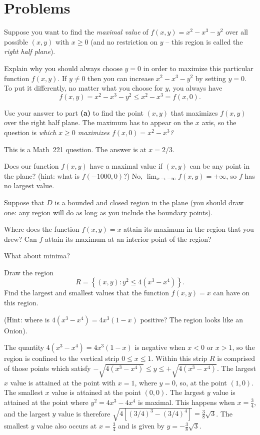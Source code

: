 \section{Problems}    
\begin{multicols}{2}
\problemfont 

\problem Suppose you want to find the \emph{maximal value} of $f(x, y) =  
x^2-x^3-y^2$ over all possible $(x,y)$ with $x\geq 0$ (and no restriction
on $y$ -- this region is called the \textit{right half plane}).

\subprob Explain why you should always choose $y=0$ in order to 
maximize this particular function $f(x, y)$.
\answer If $y\neq0$ then you can increase $x^2-x^3-y^2$ by setting $y=0$.  
To put it differently, no matter what you choose for $y$, you always have
\[
  f(x, y) = x^2-x^3-y^2 \leq x^2-x^3  =  f(x, 0).
\]
\endanswer

\subprob Use your answer to part \textbf{(a)} to find the point $(x, y)$ that 
maximizes $f(x,y)$ over the right half plane.
\answer 
The maximum has to appear on the $x$ axis, so the question is
\textit{which $x\geq0$ maximizes $f(x, 0) = x^2-x^3$?}

This is a Math~221 question.  The answer is at $x=2/3$.
\endanswer

\subprob Does our function $f(x,y)$ have a maximal value if $(x,y)$ can be 
any point in the plane?  (hint: what is $f(-1000, 0)$?)
\answer  
No, $\lim_{x\to-\infty} f(x, y) = +\infty$, so $f$ has no largest value.
\endanswer

\problem Suppose that $D$ is a bounded and closed region in the plane (you should draw one: any region will do as long as you include the boundary points).

Where does the function $f(x, y)=x$ attain its maximum in the region that you drew?  Can $f$ attain its maximum at an interior point of the region?

What about minima?

\problem Draw the region
\[
R=\left\{ (x,y) : y^2\leq 4(x^3-x^4)  \right\}.
\]
Find the largest and smallest values that the function
$f(x, y) = x$ can have on this region.  

(Hint: where is $4(x^3-x^4) = 4x^3(1-x)$ positive? The region looks like an Onion).
\answer  
%

The quantity $4(x^3-x^4) = 4x^3(1-x)$ is negative when $x<0$ or
$x>1$, so the region is confined to the vertical strip $0\leq x \leq
1$.  Within this strip $R$ is comprised of those points which satisfy
$-\sqrt{4(x^3-x^4)} \leq y \leq +\sqrt{4(x^3-x^4)}$.  The largest
$x$ value is attained at the point with $x=1$, where $y=0$, so, at the
point $(1,0)$.  The smallest $x$ value is attained at the point
$(0,0)$.   The largest $y$ value is attained at the point where
$y^2 = 4x^3-4x^4$ is maximal.  This happens when $x=\frac 34$, and the
largest $y$ value is therefore $\sqrt{4[(3/4)^3-(3/4)^4]} = \frac
38\sqrt{3}$.  The smallest $y$ value also occurs at $x=\frac 34$ and
is given by $y = -\frac 38 \sqrt 3$.
\endanswer

\noproblemfont
\end{multicols}

